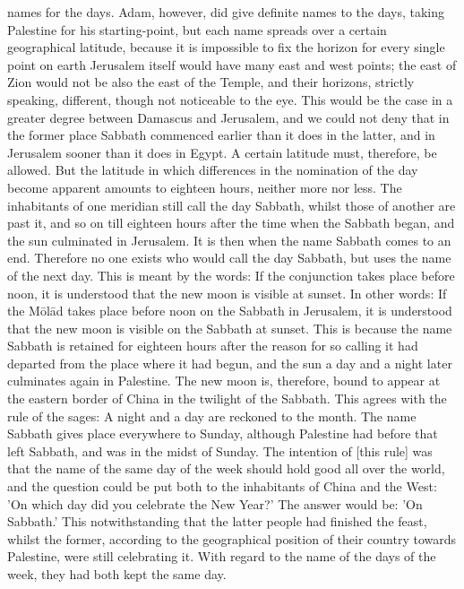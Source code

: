 \documentclass[12pt]{article}
\begin{document}
names for the days. Adam, however, did give definite names to the days, taking Palestine for his starting-point, but each name spreads over a certain geographical latitude, because it is impossible to fix the horizon for every single point on earth Jerusalem itself would have many east and west points; the east of Zion would not be also the east of the Temple, and their horizons, strictly speaking, different, though not noticeable to the eye. This would be the case in a greater degree between Damascus and Jerusalem, and we could not deny that in the former place Sabbath commenced earlier than it does in the latter, and in Jerusalem sooner than it does in Egypt. A certain latitude must, therefore, be allowed. But the latitude in which differences in the nomination of the day become apparent amounts to eighteen hours, neither more nor less. The inhabitants of one meridian still call the day Sabbath, whilst those of another are past it, and so on till eighteen hours after the time when the Sabbath began, and the sun culminated in Jerusalem. It is then when the name Sabbath comes to an end. Therefore no one exists who would call the day Sabbath, but uses the name of the next day. This is meant by the words: If the conjunction takes place before noon, it is understood that the new moon is visible at sunset. In other words: If the Mōlād takes place before noon on the Sabbath in Jerusalem, it is understood that the new moon is visible on the Sabbath at sunset. This is because the name Sabbath is retained for eighteen hours after the reason for so calling it had departed from the place where it had begun, and the sun a day and a night later culminates again in Palestine. The new moon is, therefore, bound to appear at the eastern border of China in the twilight of the Sabbath. This agrees with the rule of the sages: A night and a day are reckoned to the month. The name Sabbath gives place everywhere to Sunday, although Palestine had before that left Sabbath, and was in the midst of Sunday. The intention of [this rule] was that the name of the same day of the week should hold good all over the world, and the question could be put both to the inhabitants of China and the West: 'On which day did you celebrate the New Year?' The answer would be: 'On Sabbath.' This notwithstanding that the latter people had finished the feast, whilst the former, according to the geographical position of their country towards Palestine, were still celebrating it. With regard to the name of the days of the week, they had both kept the same day.
\end{document}
